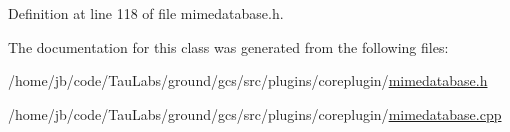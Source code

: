 \-Definition at line 118 of file mimedatabase.\-h.



\-The documentation for this class was generated from the following files\-:\begin{DoxyCompactItemize}
\item 
/home/jb/code/\-Tau\-Labs/ground/gcs/src/plugins/coreplugin/\hyperlink{mimedatabase_8h}{mimedatabase.\-h}\item 
/home/jb/code/\-Tau\-Labs/ground/gcs/src/plugins/coreplugin/\hyperlink{mimedatabase_8cpp}{mimedatabase.\-cpp}\end{DoxyCompactItemize}
